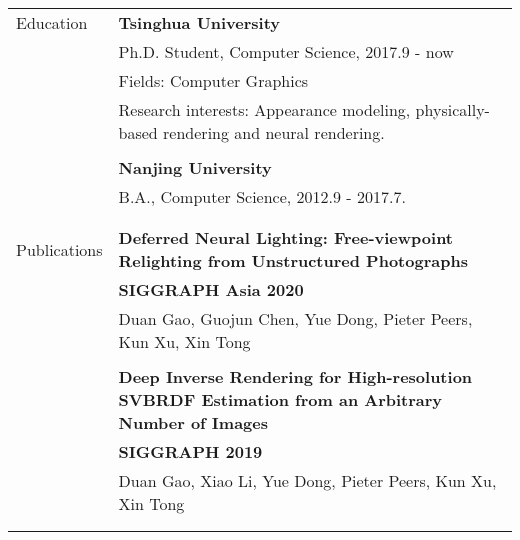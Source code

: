 \documentclass[letterpaper,11pt,oneside]{article}
\begin{document}
\renewcommand{\arraystretch}{1.0}
\noindent \begin{tabular}{@{} l l}
 \Large{Education}    & \textbf{Tsinghua University} \\
     & Ph.D. Student, Computer Science, 2017.9 - now \\
     & Fields:  Computer Graphics\\
      & \parbox{5.0in}{ Research interests: Appearance modeling, physically-based rendering and neural rendering.} \\
     & \\
     & \textbf{Nanjing University} \\
     & B.A., Computer Science, 2012.9 - 2017.7. \\
     & \\
     & \\
     
 \Large{Publications} 
 	 & \parbox{5.0in}{\textbf{Deferred Neural Lighting: Free-viewpoint Relighting from Unstructured Photographs}} \\
 	 & \parbox{5.0in}{\textbf{SIGGRAPH Asia 2020}} \\ 
 	  \vspace{3pt}
 	 & \parbox{5.0in}{Duan Gao, Guojun Chen, Yue Dong, Pieter Peers, Kun Xu, Xin Tong} \\
 	 & \\
     & \parbox{5.0in}{\textbf{Deep Inverse Rendering for High-resolution SVBRDF Estimation from an Arbitrary Number of Images}} \\
     & \parbox{5.0in}{\textbf{SIGGRAPH 2019}} \\
     & \parbox{5.0in}{Duan Gao, Xiao Li, Yue Dong, Pieter Peers, Kun Xu, Xin Tong} \\
     & \\
	 & \\
	 

\end{tabular}
\end{document}
